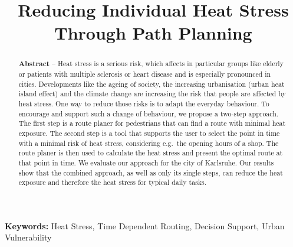 \documentclass[a4paper,parskip=half]{scrartcl}
\title{Reducing Individual Heat Stress Through Path Planning}
\author{}
\providecommand{\keywords}[1]{\textbf{Keywords:} #1}
\begin{document}
\maketitle

\begin{abstract}
\noindent \textbf{Abstract} -- Heat stress is a serious risk, which affects in particular  groups like elderly or patients with multiple sclerosis or heart disease and is especially pronounced in cities. Developments like the ageing of society, the increasing urbanisation (urban heat island effect) and the climate change are increasing the risk that people are affected by heat stress. One way to reduce those risks is to adapt the everyday behaviour. 
To encourage and support such a change of behaviour, we propose a two-step approach. The first step is a route planer for pedestrians that can find a route with minimal heat exposure. The second step is a tool that supports the user to select the point in time with a minimal risk of heat stress, considering e.g.\ the opening hours of a shop. The route planer is then used to calculate the heat stress and present the optimal route at that point in time.
We evaluate our approach for the city of Karlsruhe. 	
Our results show that the combined approach, as well as only its single steps, can reduce the heat exposure and therefore the heat stress for typical daily tasks.
\end{abstract}

\keywords{Heat Stress, Time Dependent Routing, Decision Support, Urban Vulnerability}






%


\printbibliography
\end{document}
